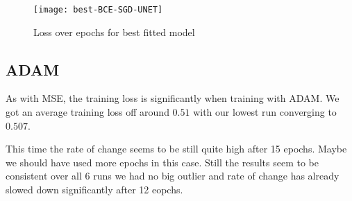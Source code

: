 \begin{figure}[h]
    \texttt{[image: best-BCE-SGD-UNET]}
    \caption{\label{im:best-BCE-SGD-UNET} Loss over epochs for best fitted model}
\end{figure}

\newpage

\subsection{ADAM}

As with MSE, the training loss is significantly when training with ADAM. We got an average training loss
off around $0.51$ with our lowest run converging to $0.507$.

This time the rate of change seems to be still quite high after 15 epochs. Maybe we should have used more 
epochs in this case. Still the results seem to be consistent over all 6 runs we had no big outlier and rate of 
change has already slowed down significantly after 12 eopchs.

